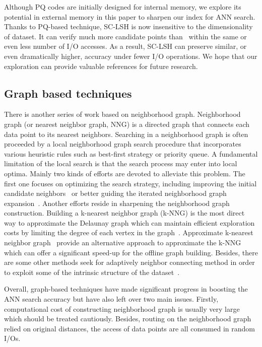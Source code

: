 \documentclass[twocolumn]{svjour3}          %
\begin{document}
Although PQ codes are initially designed for internal memory, we explore its potential in external memory in this paper to sharpen our index for ANN search. Thanks to PQ-based technique, SC-LSH is now insensitive to the dimensionality of dataset. It can verify much more candidate points than~\cite{Liu2014SKLSH} within the same or even less number of I/O accesses. As a result, SC-LSH can preserve similar, or even dramatically higher, accuracy under fewer I/O operations. We hope that our exploration can provide valuable references for future research.

\subsection{Graph based techniques}
There is another series of work based on neighborhood graph. Neighborhood graph (or nearest neighbor graph, NNG) is a directed graph that connects each data point to its nearest neighbors. Searching in a neighborhood graph is often proceeded by a local neighborhood graph search procedure that incorporates various heuristic rules such as best-first strategy or priority queue. A fundamental limitation of the local search is that the search process may enter into local optima. 
Mainly two kinds of efforts are devoted to alleviate this problem. The first one focuses on optimizing the search strategy, including improving the initial candidate neighbors~\cite{Hajebi2009AkNNG,Jin2014NNE} or better guiding the iterated neighborhood graph expansion~\cite{Wang2012Query,WangJD2013NNGPQ,Malkov2016HNSW,Fu2016EFANNA}. Another efforts reside in sharpening the neighborhood graph construction. Building a k-nearest neighbor graph (k-NNG) is the most direct way to approximate the Delaunay graph which can maintain efficient exploration costs by limiting the degree of each vertex in the graph~\cite{Dong2011kNNG,Paredes2006kNNG}. Approximate k-nearest neighbor graph~\cite{Hajebi2009AkNNG,Ponomarenko2011,Gan2012ScalablekNNG,Zhang2013FastkNNG} provide an alternative approach to approximate the k-NNG which can offer a significant speed-up for the offline graph building. Besides, there are some other methods seek for adaptively neighbor connecting method in order to exploit some of the intrinsic structure of the dataset~\cite{Malkov2014SmallWorld,HarwoodD2016FANNG}. 
  
Overall, graph-based techniques have made significant progress in boosting the ANN search accuracy but have also left over two main issues. Firstly, computational cost of constructing neighborhood graph is usually very large which should be treated cautiously. Besides, routing on the neighborhood graph relied on original distances, the access of data points are all consumed in random I/Os.
\end{document}

